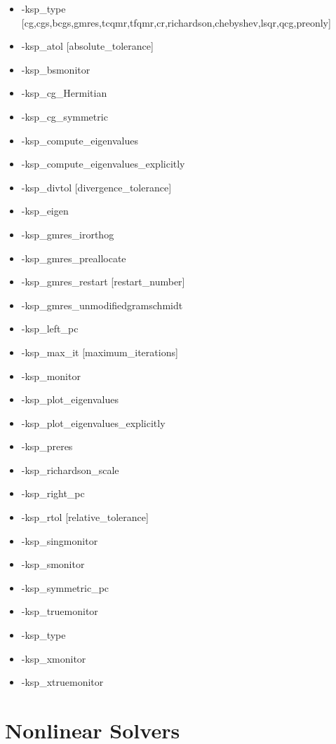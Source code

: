 \begin{itemize}
\item -ksp\_type [cg,cgs,bcgs,gmres,tcqmr,tfqmr,cr,richardson,chebyshev,lsqr,qcg,preonly]
\item -ksp\_atol [absolute\_tolerance]
\item -ksp\_bsmonitor
\item -ksp\_cg\_Hermitian
\item -ksp\_cg\_symmetric
\item -ksp\_compute\_eigenvalues
\item -ksp\_compute\_eigenvalues\_explicitly
\item -ksp\_divtol [divergence\_tolerance]
\item -ksp\_eigen
\item -ksp\_gmres\_irorthog
\item -ksp\_gmres\_preallocate
\item -ksp\_gmres\_restart [restart\_number]
\item -ksp\_gmres\_unmodifiedgramschmidt
\item -ksp\_left\_pc
\item -ksp\_max\_it [maximum\_iterations]
\item -ksp\_monitor
\item -ksp\_plot\_eigenvalues
\item -ksp\_plot\_eigenvalues\_explicitly
\item -ksp\_preres
\item -ksp\_richardson\_scale
\item -ksp\_right\_pc
\item -ksp\_rtol [relative\_tolerance]
\item -ksp\_singmonitor
\item -ksp\_smonitor
\item -ksp\_symmetric\_pc
\item -ksp\_truemonitor
\item -ksp\_type
\item -ksp\_xmonitor
\item -ksp\_xtruemonitor
\end{itemize}


{\small
\noindent

}

\section{Nonlinear Solvers}

